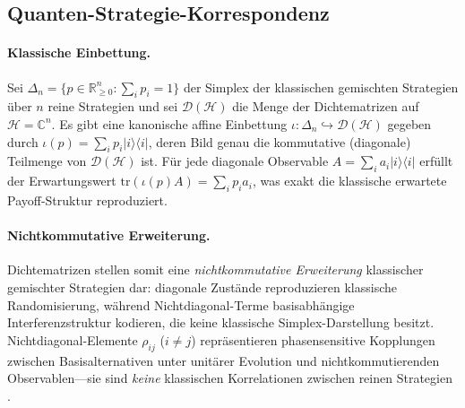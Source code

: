 \documentclass[12pt,a4paper]{article}
\theoremstyle{remark}
\begin{document}
\subsection{Quanten-Strategie-Korrespondenz}

\paragraph{Klassische Einbettung.}
Sei $\Delta_n = \{p \in \mathbb{R}_{\geq 0}^n : \sum_i p_i = 1\}$ der Simplex der klassischen gemischten Strategien \"uber $n$ reine Strategien und sei $\mathcal{D}(\mathcal{H})$ die Menge der Dichtematrizen auf $\mathcal{H} = \mathbb{C}^n$. Es gibt eine kanonische affine Einbettung $\iota: \Delta_n \hookrightarrow \mathcal{D}(\mathcal{H})$ gegeben durch $\iota(p) = \sum_i p_i |i\rangle\langle i|$, deren Bild genau die kommutative (diagonale) Teilmenge von $\mathcal{D}(\mathcal{H})$ ist. F\"ur jede diagonale Observable $A = \sum_i a_i |i\rangle\langle i|$ erf\"ullt der Erwartungswert $\mathrm{tr}(\iota(p) A) = \sum_i p_i a_i$, was exakt die klassische erwartete Payoff-Struktur reproduziert.

\paragraph{Nichtkommutative Erweiterung.}
Dichtematrizen stellen somit eine \emph{nichtkommutative Erweiterung} klassischer gemischter Strategien dar: diagonale Zust\"ande reproduzieren klassische Randomisierung, w\"ahrend Nichtdiagonal-Terme basisabh\"angige Interferenzstruktur kodieren, die keine klassische Simplex-Darstellung besitzt. Nichtdiagonal-Elemente $\rho_{ij}$ ($i \neq j$) repr\"asentieren phasensensitive Kopplungen zwischen Basisalternativen unter unit\"arer Evolution und nichtkommutierenden Observablen---sie sind \emph{keine} klassischen Korrelationen zwischen reinen Strategien \citep{Lindblad1976}.
\end{document}
